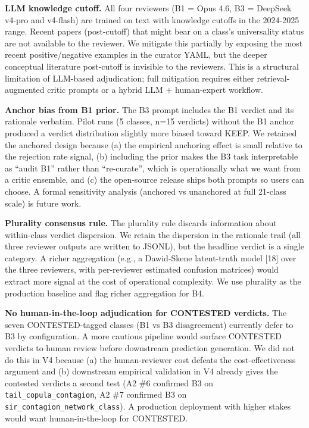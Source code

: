 \documentclass[
  letterpaper,
  11pt]{article}
\begin{document}
\textbf{LLM knowledge cutoff.} All four reviewers (B1 = Opus 4.6, B3 =
DeepSeek v4-pro and v4-flash) are trained on text with knowledge cutoffs
in the 2024-2025 range. Recent papers (post-cutoff) that might bear on a
class's universality status are not available to the reviewer. We
mitigate this partially by exposing the most recent positive/negative
examples in the curator YAML, but the deeper conceptual literature
post-cutoff is invisible to the reviewers. This is a structural
limitation of LLM-based adjudication; full mitigation requires either
retrieval-augmented critic prompts or a hybrid LLM + human-expert
workflow.

\textbf{Anchor bias from B1 prior.} The B3 prompt includes the B1
verdict and its rationale verbatim. Pilot runs (5 classes, n=15
verdicts) without the B1 anchor produced a verdict distribution slightly
more biased toward KEEP. We retained the anchored design because (a) the
empirical anchoring effect is small relative to the rejection rate
signal, (b) including the prior makes the B3 task interpretable as
``audit B1'' rather than ``re-curate'', which is operationally what we
want from a critic ensemble, and (c) the open-source release ships both
prompts so users can choose. A formal sensitivity analysis (anchored vs
unanchored at full 21-class scale) is future work.

\textbf{Plurality consensus rule.} The plurality rule discards
information about within-class verdict dispersion. We retain the
dispersion in the rationale trail (all three reviewer outputs are
written to JSONL), but the headline verdict is a single category. A
richer aggregation (e.g., a Dawid-Skene latent-truth model {[}18{]} over
the three reviewers, with per-reviewer estimated confusion matrices)
would extract more signal at the cost of operational complexity. We use
plurality as the production baseline and flag richer aggregation for B4.

\textbf{No human-in-the-loop adjudication for CONTESTED verdicts.} The
seven CONTESTED-tagged classes (B1 vs B3 disagreement) currently defer
to B3 by configuration. A more cautious pipeline would surface CONTESTED
verdicts to human review before downstream prediction generation. We did
not do this in V4 because (a) the human-reviewer cost defeats the
cost-effectiveness argument and (b) downstream empirical validation in
V4 already gives the contested verdicts a second test (A2 \#6 confirmed
B3 on \texttt{tail\_copula\_contagion}, A2 \#7 confirmed B3 on
\texttt{sir\_contagion\_network\_class}). A production deployment with
higher stakes would want human-in-the-loop for CONTESTED.
\end{document}
